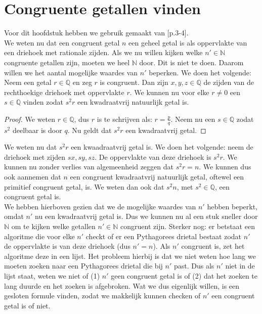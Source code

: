 \documentclass[12pt,reqno]{article}
\newcommand*{\NN}{\ensuremath{\mathbb{N}}}
\newcommand*{\QQ}{\ensuremath{\mathbb{Q}}}
\theoremstyle{theorem}
\theoremstyle{definition}
\begin{document}
	\section{Congruente getallen vinden}
	Voor dit hoofdstuk hebben we gebruik gemaakt van \cite{Koblitz}[p.3-4].\\
	We weten nu dat een congruent getal $n$ een geheel getal is als oppervlakte van een driehoek met rationale zijden. Als we nu willen kijken welke $n'\in\NN$ congruente getallen zijn, moeten we heel $\NN$ door. Dit is niet te doen. Daarom willen we het aantal mogelijke waardes van $n'$ beperken. We doen het volgende:\\
	Neem een getal $r\in\QQ$ en zeg $r$ is congruent. Dan zijn $x,y,z\in\QQ$ de zijden van de rechthoekige driehoek met oppervlakte $r$. We kunnen nu voor elke $r\neq0$ een $s\in\QQ$ vinden zodat $s^2r$ een kwadraatvrij natuurlijk getal is.
	\begin{proof}
		We weten $r\in\QQ$, dus $r$ is te schrijven als: $r=\frac{p}{q}$. Neem nu een $s\in\QQ$ zodat $s^2$ deelbaar is door $q$. {\color{red}Nu geldt dat $s^2r$ een kwadraatvrij getal.}
	\end{proof}
	We weten nu dat $s^2r$ een kwaadraatvrij getal is. We doen het volgende: neem de driehoek met zijden $sx,sy,sz$. De oppervlakte van deze driehoek is $s^2r$. We kunnen nu zonder verlies van algemeenheid zeggen dat $s^2r=n$. We kunnen dus ook aannemen dat $n$ een congruent kwadraatvrij natuurlijk getal, oftewel een primitief congruent getal, is. We weten dan ook dat $s^2n$, met $s^2\in\QQ$, een congruent getal is.  \\
	
	We hebben hierboven gezien dat we de mogelijke waardes van $n'$ hebben beperkt, omdat $n'$ nu een kwadraatvrij getal is. Dus we kunnen nu al een stuk sneller door $\NN$ om te kijken welke getallen $n'\in\NN$ congruent zijn. Sterker nog: er betstaat een algoritme die voor elke $n'$ checkt of er een Pythagorees drietal bestaat zodat $n'$ de oppervlakte is van deze driehoek (dus $n'=n$). Als $n'$ congruent is, zet het algoritme deze in een lijst. Het probleem hierbij is dat we niet weten hoe lang we moeten zoeken naar een Pythagorees drietal die bij $n'$ past. Dus als $n'$ niet in de lijst staat, weten we niet of (1) $n'$ geen congruent getal is of (2) dat het zoeken te lang duurde en het zoeken is afgebroken. Wat we dus eigenlijk willen, is een gesloten formule vinden, zodat we makkelijk kunnen checken of $n'$ een congruent getal is of niet.\\
	
\end{document}
